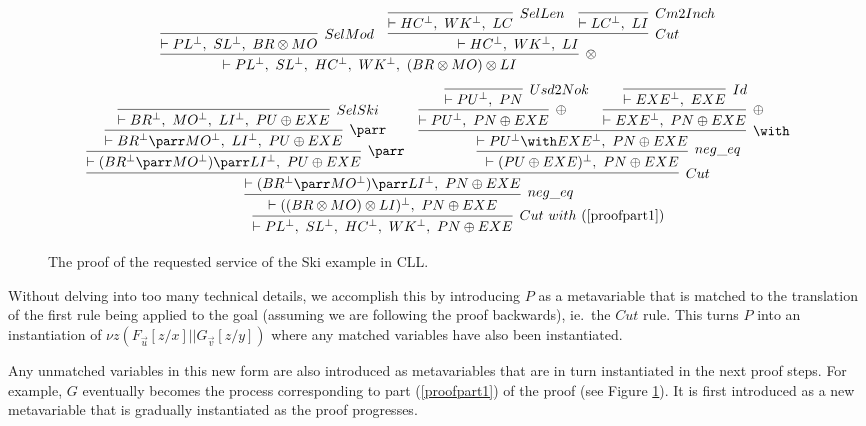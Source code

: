 \documentclass[copyright,creativecommons]{eptcs}
\begin{document}
\begin{figure}[htbp]
	\centering
	\scriptsize
	\begin{equation}
		\label{proofpart1}
		\infer[\otimes]{\vdash PL^\bot,\ SL^\bot,\ HC^\bot,\ WK^\bot,\ (BR \otimes MO) \otimes LI}{
			\infer[SelMod]{\vdash PL^\bot,\ SL^\bot,\ BR \otimes MO}{}
			&
			\infer[Cut]{\vdash HC^\bot,\ WK^\bot,\ LI}{
				\infer[SelLen]{\vdash HC^\bot,\ WK^\bot,\ LC}{}
				&
				\infer[Cm2Inch]{\vdash LC^\bot,\ LI}{}
			}
		}
	\end{equation}
	\medskip
	\medskip
	\begin{equation}
		\label{proofpart2}
	\infer[Cut\ with\ (\ref{proofpart1})]{\vdash PL^\bot,\ SL^\bot,\ HC^\bot,\ WK^\bot,\ PN \oplus EXE}{
		\infer[neg\_eq]{\vdash((BR \otimes MO) \otimes LI)^\bot,\ PN \oplus EXE}{
			\infer[Cut]{\vdash (BR^\bot \parr MO^\bot) \parr LI^\bot,\ PN \oplus EXE}{
				\infer[\parr]{\vdash (BR^\bot \parr MO^\bot) \parr LI^\bot,\ PU \oplus EXE}{
					\infer[\parr]{\vdash BR^\bot \parr MO^\bot,\ LI^\bot,\ PU \oplus EXE}{
						\infer[SelSki]{\vdash BR^\bot,\ MO^\bot,\ LI^\bot,\ PU \oplus EXE}{}
					}
				}
				&
				\infer[neg\_eq]{\vdash (PU \oplus EXE)^\bot,\ PN \oplus EXE}{
					\infer[\with]{\vdash PU^\bot \with EXE^\bot,\ PN \oplus EXE}{
						\infer[\oplus]{\vdash PU^\bot,\ PN \oplus EXE}{
							\infer[Usd2Nok]{\vdash PU^\bot,\ PN}{}
						}
						&
						\infer[\oplus]{\vdash EXE^\bot,\ PN \oplus EXE}{
							\infer[Id]{\vdash EXE^\bot,\ EXE}{}
						}
					}
				}
			}
		}
	}
	\end{equation}
	\normalsize
	\caption{The proof of the requested service of the Ski example in CLL.}
	\label{fig:SProof2}
\end{figure}


Without delving into too many technical details, we accomplish this by introducing $P$ as a metavariable that is matched to the translation of the first rule being applied to the goal (assuming we are following the proof backwards), ie.\ the $Cut$ rule. This turns $P$ into an instantiation of $\nu z (F_{\vec{u}}[z/x] || G_{\vec{v}}[z/y])$ where any matched variables have also been instantiated. 

Any unmatched variables in this new form are also introduced as metavariables that are in turn instantiated in the next proof steps. For example, $G$ eventually becomes the process corresponding to part (\ref{proofpart1}) of the proof (see Figure \ref{fig:SProof2}). It is first introduced as a new metavariable that is gradually instantiated as the proof progresses. 
\end{document}
